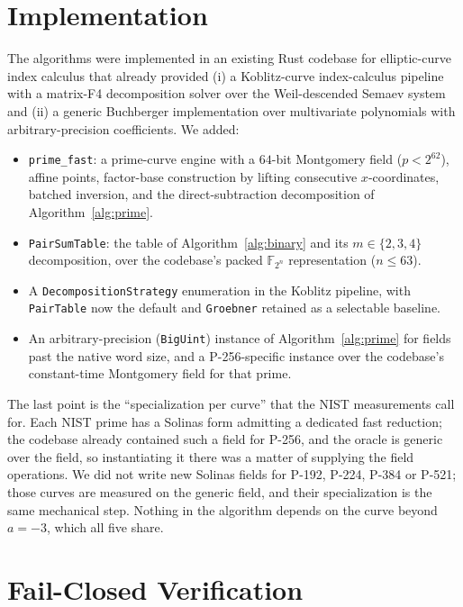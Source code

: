 \documentclass[10pt,a4paper]{article}
\theoremstyle{remark}
\newcommand{\FF}{\mathbb{F}}
\newcommand{\code}[1]{\texttt{#1}}
\begin{document}
\section{Implementation}
\label{sec:impl}

The algorithms were implemented in an existing Rust codebase for
elliptic-curve index calculus that already provided (i) a Koblitz-curve
index-calculus pipeline with a matrix-F4 decomposition solver over the
Weil-descended Semaev system and (ii) a generic Buchberger
implementation over multivariate polynomials with arbitrary-precision
coefficients. We added:

\begin{itemize}
\item \code{prime\_fast}: a prime-curve engine with a $64$-bit Montgomery
  field ($p < 2^{62}$), affine points, factor-base construction by
  lifting consecutive $x$-coordinates, batched inversion, and the
  direct-subtraction decomposition of Algorithm~\ref{alg:prime}.
\item \code{PairSumTable}: the table of Algorithm~\ref{alg:binary} and
  its $m \in \{2,3,4\}$ decomposition, over the codebase's packed
  $\FF_{2^n}$ representation ($n \le 63$).
\item A \code{DecompositionStrategy} enumeration in the Koblitz
  pipeline, with \code{PairTable} now the default and \code{Groebner}
  retained as a selectable baseline.
\item An arbitrary-precision (\code{BigUint}) instance of
  Algorithm~\ref{alg:prime} for fields past the native word size, and a
  P-256-specific instance over the codebase's constant-time Montgomery
  field for that prime.
\end{itemize}

The last point is the ``specialization per curve'' that the NIST
measurements call for. Each NIST prime has a Solinas form admitting a
dedicated fast reduction; the codebase already contained such a field
for P-256, and the oracle is generic over the field, so instantiating
it there was a matter of supplying the field operations. We did not
write new Solinas fields for P-192, P-224, P-384 or P-521; those curves
are measured on the generic field, and their specialization is the same
mechanical step. Nothing in the algorithm depends on the curve beyond
$a = -3$, which all five share.

\section{Fail-Closed Verification}
\label{sec:verification}
\end{document}
